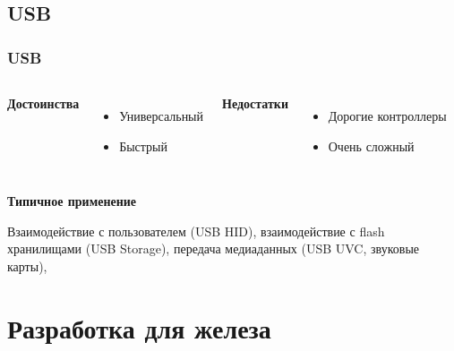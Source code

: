 \subsection{USB}
\begin{frame}
  \frametitle{USB}
  \begin{columns}
    \column{4cm}
    \begin{center}
      {\bf\large Достоинства}
    \end{center}
    \begin{itemize}
       \item Универсальный
       \item Быстрый
    \end{itemize}
    \column{4cm}
    \begin{center}
      {\bf\large Недостатки}
    \end{center}
    \begin{itemize}
       \item Дорогие контроллеры
       \item Очень сложный
    \end{itemize}
  \end{columns}
  \begin{center}
    {\bf\large Типичное применение}
  \end{center}
  Взаимодействие с пользователем (USB HID), взаимодействие с flash хранилищами (USB Storage), передача медиаданных (USB UVC, звуковые карты), 
\end{frame}
\section{Разработка для железа}
